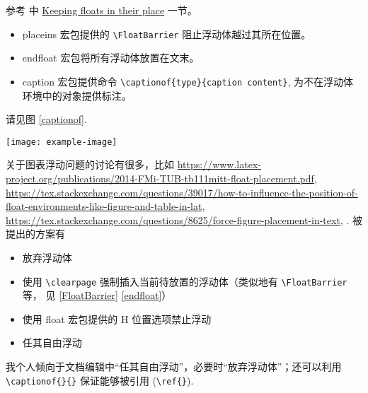 参考 \cite{wiki:floats} 中 \href{https://en.wikibooks.org/wiki/LaTeX/Floats,\_Figures\_and\_Captions\#Keeping\_floats\_in\_their\_place}{Keeping floats in their place} 一节。

\begin{itemize}
  \item\label{FloatBarrier} placeins 宏包提供的 \verb+\FloatBarrier+ 阻止浮动体越过其所在位置。
  \item\label{endfloat} endfloat 宏包将所有浮动体放置在文末。
  \item caption 宏包提供命令 \verb+\captionof{type}{caption content}+, 为不在浮动体环境中的对象提供标注。
\end{itemize}
\begin{sidelst}
请见图 \ref{captionof}.

\texttt{[image: example-image]}
\label{captionof}
\end{sidelst}

关于图表浮动问题的讨论有很多，比如 \url{https://www.latex-project.org/publications/2014-FMi-TUB-tb111mitt-float-placement.pdf}, \url{https://tex.stackexchange.com/questions/39017/how-to-influence-the-position-of-float-environments-like-figure-and-table-in-lat}, \url{https://tex.stackexchange.com/questions/8625/force-figure-placement-in-text}, \cite{placement}. 被提出的方案有
\begin{itemize}
  \item 放弃浮动体
  \item 使用 \verb+\clearpage+ 强制插入当前待放置的浮动体（类似地有 \verb+\FloatBarrier+ 等， 见 \ref{FloatBarrier} \ref{endfloat}）
  \item 使用 float 宏包提供的 H 位置选项禁止浮动
  \item 任其自由浮动
\end{itemize}
我个人倾向于文档编辑中“任其自由浮动”，必要时“放弃浮动体”；还可以利用 \verb+\captionof{}{}+ 保证能够被引用 (\verb+\ref{}+).